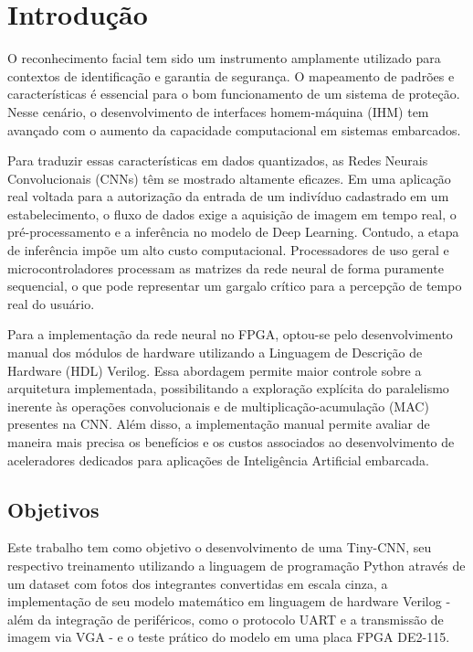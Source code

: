 \chapter{Introdução}
O reconhecimento facial tem sido um instrumento amplamente utilizado para contextos de identificação e garantia de segurança. O mapeamento de padrões e características é essencial para o bom funcionamento de um sistema de proteção. Nesse cenário, o desenvolvimento de interfaces homem-máquina (IHM) tem avançado com o aumento da capacidade computacional em sistemas embarcados.

Para traduzir essas características em dados quantizados, as Redes Neurais Convolucionais (CNNs) têm se mostrado altamente eficazes. Em uma aplicação real voltada para a autorização da entrada de um indivíduo cadastrado em um estabelecimento, o fluxo de dados exige a aquisição de imagem em tempo real, o pré-processamento e a inferência no modelo de Deep Learning. Contudo, a etapa de inferência impõe um alto custo computacional. Processadores de uso geral e microcontroladores processam as matrizes da rede neural de forma puramente sequencial, o que pode representar um gargalo crítico para a percepção de tempo real do usuário.

Para a implementação da rede neural no FPGA, optou-se pelo desenvolvimento manual dos módulos de hardware utilizando a Linguagem de Descrição de Hardware (HDL) Verilog. Essa abordagem permite maior controle sobre a arquitetura implementada, possibilitando a exploração explícita do paralelismo inerente às operações convolucionais e de multiplicação-acumulação (MAC) presentes na CNN. Além disso, a implementação manual permite avaliar de maneira mais precisa os benefícios e os custos associados ao desenvolvimento de aceleradores dedicados para aplicações de Inteligência Artificial embarcada.

\section{Objetivos}
Este trabalho tem como objetivo o desenvolvimento de uma Tiny-CNN, seu respectivo treinamento utilizando a linguagem de programação Python através de um dataset com fotos dos integrantes convertidas em escala cinza, a implementação de seu modelo matemático em linguagem de hardware Verilog - além da integração de periféricos, como o protocolo UART e a transmissão de imagem via VGA - e o teste prático do modelo em uma placa FPGA DE2-115.

